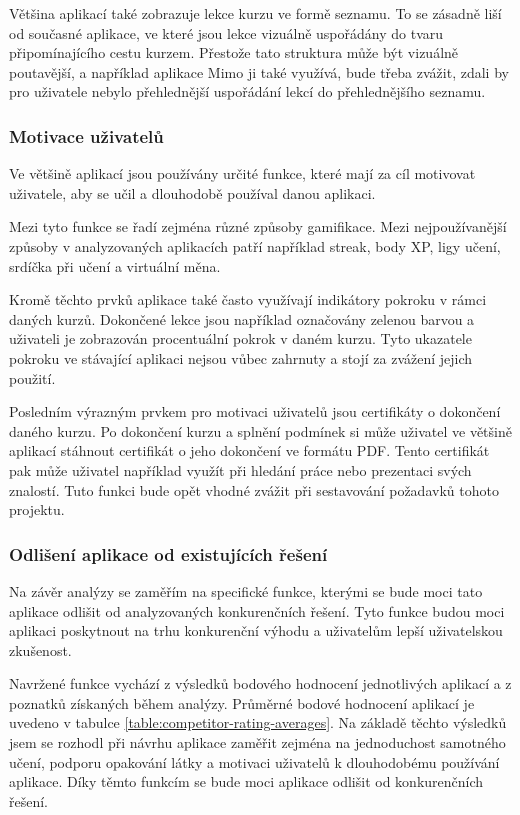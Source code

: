 Většina aplikací také zobrazuje lekce kurzu ve formě seznamu. To se zásadně liší od současné aplikace, ve které jsou lekce vizuálně uspořádány do tvaru připomínajícího cestu kurzem. Přestože tato struktura může být vizuálně poutavější, a například aplikace Mimo ji také využívá, bude třeba zvážit, zdali by pro uživatele nebylo přehlednější uspořádání lekcí do přehlednějšího seznamu.

\subsubsection{Motivace uživatelů}

Ve většině aplikací jsou používány určité funkce, které mají za cíl motivovat uživatele, aby se učil a dlouhodobě používal danou aplikaci.

Mezi tyto funkce se řadí zejména různé způsoby gamifikace. Mezi nejpoužívanější způsoby v analyzovaných aplikacích patří například streak, body XP, ligy učení, srdíčka při učení a virtuální měna.

Kromě těchto prvků aplikace také často využívají indikátory pokroku v rámci daných kurzů. Dokončené lekce jsou například označovány zelenou barvou a uživateli je zobrazován procentuální pokrok v daném kurzu. Tyto ukazatele pokroku ve stávající aplikaci nejsou vůbec zahrnuty a stojí za zvážení jejich použití.

Posledním výrazným prvkem pro motivaci uživatelů jsou certifikáty o dokončení daného kurzu. Po dokončení kurzu a splnění podmínek si může uživatel ve většině aplikací stáhnout certifikát o jeho dokončení ve formátu PDF. Tento certifikát pak může uživatel například využít při hledání práce nebo prezentaci svých znalostí. Tuto funkci bude opět vhodné zvážit při sestavování požadavků tohoto projektu.

\subsubsection{Odlišení aplikace od existujících řešení}

Na závěr analýzy se zaměřím na specifické funkce, kterými se bude moci tato aplikace odlišit od analyzovaných konkurenčních řešení. Tyto funkce budou moci aplikaci poskytnout na trhu konkurenční výhodu a uživatelům lepší uživatelskou zkušenost. 

Navržené funkce vychází z výsledků bodového hodnocení jednotlivých aplikací a z poznatků získaných během analýzy. Průměrné bodové hodnocení aplikací je uvedeno v tabulce \ref{table:competitor-rating-averages}. Na základě těchto výsledků jsem se rozhodl při návrhu aplikace zaměřit zejména na jednoduchost samotného učení, podporu opakování látky a motivaci uživatelů k dlouhodobému používání aplikace. Díky těmto funkcím se bude moci aplikace odlišit od konkurenčních řešení.

